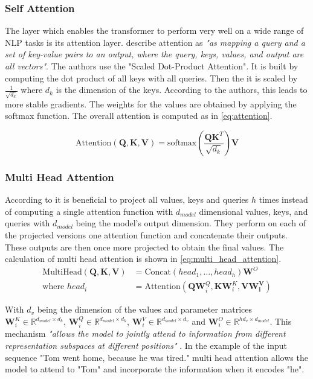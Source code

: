 \subsubsection{Self Attention}
The layer which enables the transformer to perform very well on a wide range of \ac{NLP} tasks is its attention layer.
\Textcite{Vaswani:2017} describe attention as \textit{"as mapping a query and a set of key-value pairs to an output, where the query, keys, values, and output are all vectors"}.
The authors use the "Scaled Dot-Product Attention".
It is built by computing the dot product of all keys with all queries.
Then the it is scaled by $\frac{1}{\sqrt{d_k}}$ where $d_k$ is the dimension of the keys.
According to the authors, this leads to more stable gradients.
The weights for the values are obtained by applying the softmax function.
The overall attention is computed as in \cref{eq:attention}.

\begin{equation}\label{eq:attention}
    \text{Attention}(\bm{Q},\bm{K},\bm{V}) = \text{softmax}(\frac{\bm{Q}\bm{K}^T}{\sqrt{d_k}}) \bm{V}
\end{equation}

\subsubsection{Multi Head Attention}
According to \textcite{Vaswani:2017} it is beneficial to project all values, keys and queries $h$ times instead of computing a single attention function with $d_{model}$ dimensional values, keys, and queries with $d_{model}$ being the model's output dimension.
They perform on each of the projected versions one attention function and concatenate their outputs.
These outputs are then once more projected to obtain the final values.
The calculation of multi head attention is shown in \cref{eq:multi_head_attention}.
\begin{equation}\label{eq:multi_head_attention}
    \begin{aligned}
        \text{MultiHead}(\bm{Q},\bm{K},\bm{V}) &= \text{Concat}(head_1,\dots, head_h)\bm{W}^O\\
        \text{where }head_i &= \text{Attention}(\bm{Q}\bm{W}^Q_i, \bm{K}\bm{W}^K_i, \bm{V}\bm{W^V_i})
    \end{aligned}
\end{equation}

With $d_v$ being the dimension of the values and parameter matrices $\bm{W}^K_i \in \mathbb{R}^{d_{model} \times d_k}$, $\bm{W}^Q_i \in \mathbb{R}^{d_{model} \times d_k}$, $\bm{W}^V_i \in \mathbb{R}^{d_{model} \times d_v}$ and $\bm{W}^O_i \in \mathbb{R}^{hd_v \times d_{model}}$.
This mechanism \textit{"allows the model to jointly attend to information from different representation subspaces at different positions"} \parencite{Vaswani:2017}.
In the example of the input sequence "Tom went home, because he was tired." multi head attention allows the model to attend to "Tom" and incorporate the information when it encodes "he".
